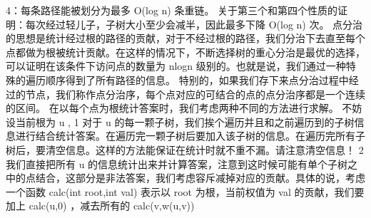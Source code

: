 {}4：每条路径能被划分为最多 \markdownRendererDollarSign{}O(\markdownRendererBackslash{}log n)\markdownRendererDollarSign{} 条重链。\markdownRendererParagraphSeparator
{}关于第三个和第四个性质的证明：每次经过轻儿子，子树大小至少会减半，因此最多下降 \markdownRendererDollarSign{}O(\markdownRendererBackslash{}log n)\markdownRendererDollarSign{} 次。\markdownRendererInterblockSeparator
{}\markdownRendererInterblockSeparator
{}
\markdownRendererSectionEnd \markdownRendererSectionBegin
{}\markdownRendererInterblockSeparator
{}点分治的思想是统计经过根的路径的贡献，对于不经过根的路径，我们分治下去直至每个点都做为根被统计贡献。在这样的情况下，不断选择树的重心分治是最优的选择，可以证明在该条件下访问点的数量为\markdownRendererDollarSign{} nlogn \markdownRendererDollarSign{}级别的。也就是说，我们通过一种特殊的遍历顺序得到了所有路径的信息。\markdownRendererParagraphSeparator
{}特别的，如果我们存下来点分治过程中经过的节点，我们称作点分治序，每个点对应的可结合的点的点分治序都是一个连续的区间。\markdownRendererParagraphSeparator
{}在以每个点为根统计答案时，我们考虑两种不同的方法进行求解。\markdownRendererParagraphSeparator
{}不妨设当前根为\markdownRendererDollarSign{} u \markdownRendererDollarSign{},\markdownRendererParagraphSeparator
{}\markdownRendererDollarSign{} 1 \markdownRendererDollarSign{}对于\markdownRendererDollarSign{} u \markdownRendererDollarSign{}的每一颗子树，我们挨个遍历并且和之前遍历到的子树信息进行结合统计答案。在遍历完一颗子树后要加入该子树的信息。在遍历完所有子树后，要清空信息。这样的方法能保证在统计时就不重不漏。请注意清空信息！\markdownRendererParagraphSeparator
{}\markdownRendererDollarSign{} 2 \markdownRendererDollarSign{}我们直接把所有\markdownRendererDollarSign{} u \markdownRendererDollarSign{}的信息统计出来并计算答案，注意到这时候可能有单个子树之中的点结合，这部分是非法答案，我们考虑容斥减掉对应的贡献。具体的说，考虑一个函数\markdownRendererDollarSign{} calc(int\markdownRendererBackslash{} root,int\markdownRendererBackslash{} val) \markdownRendererDollarSign{}表示以\markdownRendererDollarSign{} root \markdownRendererDollarSign{}为根，当前权值为\markdownRendererDollarSign{} val \markdownRendererDollarSign{}的贡献，我们要加上\markdownRendererDollarSign{} calc(u,0) \markdownRendererDollarSign{}，减去所有的\markdownRendererDollarSign{} calc(v,w(u,v)) \markdownRendererDollarSign{}\markdownRendererInterblockSeparator
{}\markdownRendererInterblockSeparator
